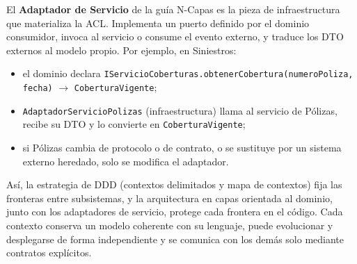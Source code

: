 El \textbf{Adaptador de Servicio} de la guía N-Capas es la pieza de infraestructura que
materializa la ACL. Implementa un puerto definido por el dominio consumidor, invoca al
servicio o consume el evento externo, y traduce los DTO externos al modelo propio. Por ejemplo,
en Siniestros:
\begin{itemize}
  \item el dominio declara \texttt{IServicioCoberturas.obtenerCobertura(numeroPoliza, fecha)}
        $\rightarrow$ \texttt{CoberturaVigente};
  \item \texttt{AdaptadorServicioPolizas} (infraestructura) llama al servicio de Pólizas,
        recibe su DTO y lo convierte en \texttt{CoberturaVigente};
  \item si Pólizas cambia de protocolo o de contrato, o se sustituye por un sistema externo
        heredado, solo se modifica el adaptador.
\end{itemize}

Así, la estrategia de DDD (contextos delimitados y mapa de contextos) fija las fronteras
entre subsistemas, y la arquitectura en capas orientada al dominio, junto con los adaptadores
de servicio, protege cada frontera en el código. Cada contexto conserva un modelo coherente
con su lenguaje, puede evolucionar y desplegarse de forma independiente y se comunica con los
demás solo mediante contratos explícitos.
